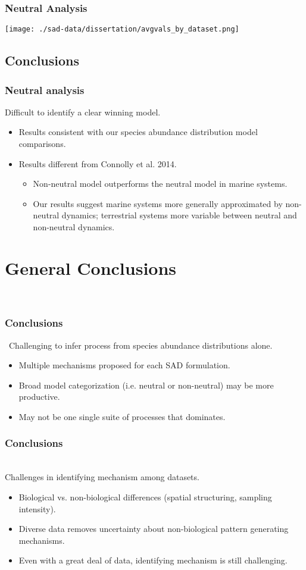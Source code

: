 \documentclass[14pt]{beamer}
\begin{document}
\begin{frame}{}
\frametitle{Neutral Analysis}
\texttt{[image: ./sad-data/dissertation/avgvals\_by\_dataset.png]}
\end{frame}

\subsection{Conclusions}
\begin{frame}
\frametitle{Neutral analysis}
Difficult to identify a clear winning model.
\begin{itemize}
\item Results consistent with our species abundance distribution model comparisons. 
\item Results different from Connolly et al. 2014.
\begin{itemize}
\item Non-neutral model outperforms the neutral model in marine systems.
\item Our results suggest marine systems more generally approximated by non-neutral dynamics; terrestrial systems more variable between neutral and non-neutral dynamics.
\end{itemize}
\end{itemize}
\end{frame}

\section{General Conclusions}
\begin{frame}{}
~\\ 
\frametitle{Conclusions}\
Challenging to infer process from species abundance distributions alone.
~\\ 
\begin{itemize}
\item Multiple mechanisms proposed for each SAD formulation.
\item Broad model categorization (i.e. neutral or non-neutral) may be more productive.
\item May not be one single suite of processes that dominates.
\end{itemize} 
\end{frame}

\begin{frame}[t]{}
\frametitle{Conclusions}\
~\\ 
Challenges in identifying mechanism among datasets.
~\\ 
\begin{itemize}
\item Biological vs. non-biological differences (spatial structuring, sampling intensity).
\item Diverse data removes uncertainty about non-biological pattern generating mechanisms.
\item Even with a great deal of data, identifying mechanism is still challenging.
\end{itemize} 
\end{frame}
\end{document}
